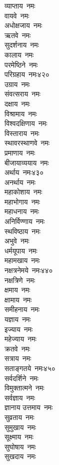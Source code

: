\begin{multicols}{2}
\begin{flushleft}
व्याप्ताय~नमः\\
वायवे~नमः\\
अधोक्षजाय~नमः\\
ऋतवे~नमः\\
सुदर्शनाय~नमः\\
कालाय~नमः\\
परमेष्ठिने~नमः\\
परिग्रहाय~नमः\hfill ४२०\\
उग्राय~नमः\\
संवत्सराय~नमः\\
दक्षाय~नमः\\
विश्रामाय~नमः\\
विश्वदक्षिणाय~नमः\\
विस्ताराय~नमः\\
स्थावरस्थाणवे~नमः\\
प्रमाणाय~नमः\\
बीजायाव्ययाय~नमः\\
अर्थाय~नमः\hfill ४३०\\
अनर्थाय~नमः\\
महाकोशाय~नमः\\
महाभोगाय~नमः\\
महाधनाय~नमः\\
अनिर्विण्णाय~नमः\\
स्थविष्ठाय~नमः\\
अभुवे~नमः\\
धर्मयूपाय~नमः\\
महामखाय~नमः\\
नक्षत्रनेमये~नमः\hfill ४४०\\
नक्षत्रिणे~नमः\\
क्षमाय~नमः\\
क्षामाय~नमः\\
समीहनाय~नमः\\
यज्ञाय~नमः\\
इज्याय~नमः\\
महेज्याय~नमः\\
क्रतवे~नमः\\
सत्राय~नमः\\
सताङ्गतये~नमः\hfill ४५०\\
सर्वदर्शिने~नमः\\
विमुक्तात्मने~नमः\\
सर्वज्ञाय~नमः\\
ज्ञानाय उत्तमाय~नमः\\
सुव्रताय~नमः\\
सुमुखाय~नमः\\
सूक्ष्माय~नमः\\
सुघोषाय~नमः\\
सुखदाय~नमः\\

\end{flushleft}
\end{multicols}

